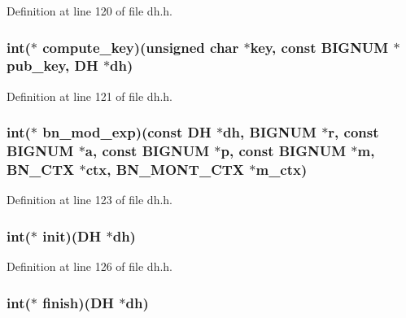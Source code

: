 Definition at line 120 of file dh.\+h.

\subsubsection[{\texorpdfstring{compute\+\_\+key}{compute_key}}]{\setlength{\rightskip}{0pt plus 5cm}int($\ast$ compute\+\_\+key)(unsigned char $\ast$key, const {\bf B\+I\+G\+N\+UM} $\ast$pub\+\_\+key, {\bf DH} $\ast$dh)}\hypertarget{structdh__method_a5ec155f24c6ba97c5321635a5047639c}{}\label{structdh__method_a5ec155f24c6ba97c5321635a5047639c}


Definition at line 121 of file dh.\+h.

\subsubsection[{\texorpdfstring{bn\+\_\+mod\+\_\+exp}{bn_mod_exp}}]{\setlength{\rightskip}{0pt plus 5cm}int($\ast$ bn\+\_\+mod\+\_\+exp)(const {\bf DH} $\ast$dh, {\bf B\+I\+G\+N\+UM} $\ast$r, const {\bf B\+I\+G\+N\+UM} $\ast${\bf a}, const {\bf B\+I\+G\+N\+UM} $\ast${\bf p}, const {\bf B\+I\+G\+N\+UM} $\ast$m, {\bf B\+N\+\_\+\+C\+TX} $\ast$ctx, {\bf B\+N\+\_\+\+M\+O\+N\+T\+\_\+\+C\+TX} $\ast$m\+\_\+ctx)}\hypertarget{structdh__method_a5808ab211d6e6f99f92b2d9bd2f0ccdc}{}\label{structdh__method_a5808ab211d6e6f99f92b2d9bd2f0ccdc}


Definition at line 123 of file dh.\+h.

\subsubsection[{\texorpdfstring{init}{init}}]{\setlength{\rightskip}{0pt plus 5cm}int($\ast$ init)({\bf DH} $\ast$dh)}\hypertarget{structdh__method_a1da5c3afff89934c575378b52e64c136}{}\label{structdh__method_a1da5c3afff89934c575378b52e64c136}


Definition at line 126 of file dh.\+h.

\subsubsection[{\texorpdfstring{finish}{finish}}]{\setlength{\rightskip}{0pt plus 5cm}int($\ast$ finish)({\bf DH} $\ast$dh)}\hypertarget{structdh__method_a3bca2ee547b69b6ced51009756d71cb0}{}\label{structdh__method_a3bca2ee547b69b6ced51009756d71cb0}


